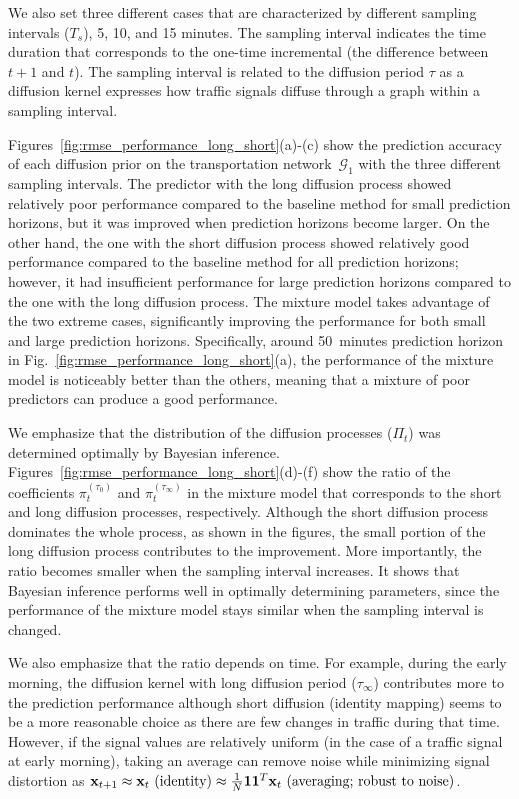 \documentclass[journal]{IEEEtran}
\begin{document}
We also set three different cases that are characterized by different sampling intervals ($T_s$), 5, 10, and 15 minutes. 
The sampling interval indicates the time duration that corresponds to the one-time incremental (the difference between $t+1$ and $t$). 
The sampling interval is related to the diffusion period $\tau$ as a diffusion kernel expresses how traffic signals diffuse through a graph within a sampling interval.



Figures~\ref{fig:rmse_performance_long_short}(a)-(c) show the prediction accuracy of each diffusion prior on the transportation network~$\mathcal{G}_1$ with the three different sampling intervals.
The predictor with the long diffusion process showed relatively poor performance compared to the baseline method for small prediction horizons, but it was improved when prediction horizons become larger. On the other hand, the one with the short diffusion process showed relatively good performance compared to the baseline method for all prediction horizons; however, it had insufficient performance for large prediction horizons compared to the one with the long diffusion process. The mixture model takes advantage of the two extreme cases, significantly improving the performance for both small and large prediction horizons. Specifically, around 50~minutes prediction horizon in Fig.~\ref{fig:rmse_performance_long_short}(a), the performance of the mixture model is noticeably better than the others, meaning that a mixture of poor predictors can produce a good performance.

We emphasize that the distribution of the diffusion processes ($\Pi_t$) was determined optimally by Bayesian inference. Figures~\ref{fig:rmse_performance_long_short}(d)-(f) show the ratio of the coefficients $\pi_t^{(\tau_0)}$ and $\pi_t^{(\tau_\infty)}$ in the mixture model that corresponds to the short and long diffusion processes, respectively. Although the short diffusion process dominates the whole process, as shown in the figures, the small portion of the long diffusion process contributes to the improvement. 
More importantly, the ratio becomes smaller when the sampling interval increases. It shows that Bayesian inference performs well in optimally determining parameters, since the performance of the mixture model stays similar when the sampling interval is changed.



We also emphasize that the ratio depends on time. 
For example, during the early morning, the diffusion kernel with long diffusion period ($\tau_\infty$) contributes more to the prediction performance
although short diffusion (identity mapping) seems to be a more reasonable choice as there are few changes in traffic during that time. 
However, if the signal values are relatively uniform (in the case of a traffic signal at early morning), taking an average can remove noise while minimizing signal distortion as
${\bf{x}}_{t+1}\approx {\bf{x}}_t\text{ (identity)} \approx \frac{1}{N}{\bf{1}}{\bf{1}}^T{\bf{x}}_t\text{ (averaging; robust to noise)}$.
\end{document}
